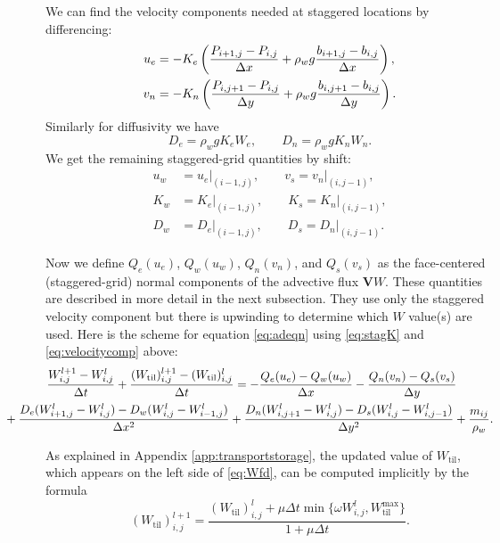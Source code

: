 \documentclass[11pt,final]{amsart}
\newcommand\bV{\mathbf{V}}
\newcommand{\Wtil}{W_{\text{til}}}
\newcommand{\Wtilmax}{W_{\text{til}}^{\text{max}}}
\newcommand{\Wlij}{W^l_{i,j}}
\begin{document}
We can find the velocity components needed at staggered locations by differencing:
\begin{align}
u_e &= - K_e \left(\frac{P_{i+1,j}-P_{i,j}}{\Delta x} + \rho_w g \frac{b_{i+1,j}-b_{i,j}}{\Delta x}\right),  \label{eq:velocitycomp} \\
v_n &= - K_n \left(\frac{P_{i,j+1}-P_{i,j}}{\Delta y} + \rho_w g \frac{b_{i,j+1}-b_{i,j}}{\Delta y}\right). \notag
\end{align}
Similarly for diffusivity we have
\begin{equation}
D_e = \rho_w g K_e W_e, \qquad D_n = \rho_w g K_n W_n.  \label{eq:diffusivitycomp}
\end{equation}
We get the remaining staggered-grid quantities by shift:
\begin{align*}
u_w &= u_e\big|_{(i-1,j)}, \qquad v_s = v_n\big|_{(i,j-1)}, \\
K_w &= K_e\big|_{(i-1,j)}, \qquad K_s = K_n\big|_{(i,j-1)}, \\
D_w &= D_e\big|_{(i-1,j)}, \qquad D_s = D_n\big|_{(i,j-1)}.
\end{align*}

Now we define $Q_e(u_e)$, $Q_w(u_w)$, $Q_n(v_n)$, and $Q_s(v_s)$ as the face-centered (staggered-grid) normal components of the advective flux $\bV W$.  These quantities are described in more detail in the next subsection.  They use only the staggered velocity component but there is upwinding to determine which $W$ value(s) are used.  Here is the scheme for equation \eqref{eq:adeqn} using \eqref{eq:stagK} and \eqref{eq:velocitycomp} above:
\begin{align}
&\frac{W_{i,j}^{l+1} - W_{i,j}^l}{\Delta t} + \frac{(\Wtil)_{i,j}^{l+1} - (\Wtil)_{i,j}^l}{\Delta t} = - \frac{Q_e(u_e) - Q_w(u_w)}{\Delta x} - \frac{Q_n(v_n) - Q_s(v_s)}{\Delta y}  \label{eq:Wfd} \\
   &\hspace{-0.5in} + \frac{D_e (W_{i+1,j}^l - \Wlij) - D_w (\Wlij - W_{i-1,j}^l)}{\Delta x^2} + \frac{D_n (W_{i,j+1}^l - \Wlij) - D_s (\Wlij - W_{i,j-1}^l)}{\Delta y^2}  + \frac{m_{ij}}{\rho_w}.  \notag
\end{align}

As explained in Appendix \ref{app:transportstorage}, the updated value of $\Wtil$, which appears on the left side of \eqref{eq:Wfd}, can be computed implicitly by the formula
\begin{equation}
(\Wtil)_{i,j}^{l+1} = \frac{(\Wtil)_{i,j}^l + \mu \Delta t \min\{\omega W_{i,j}^l, \Wtilmax\}}{1 + \mu \Delta t}.  \label{eq:tillupdatefd}
\end{equation}
\end{document}
